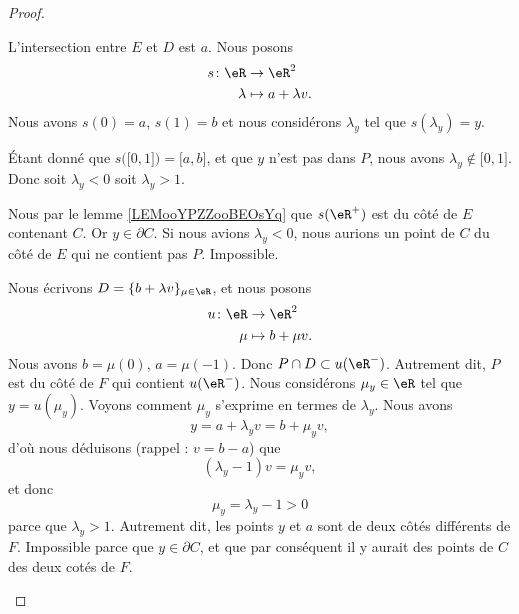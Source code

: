 \begin{proof}
\begin{subproof}
\begin{subproof}
			L'intersection entre \( E\) et \( D\) est \( a\). Nous posons
			\begin{equation}
				\begin{aligned}
					s\colon \eR & \to \eR^2            \\
					\lambda     & \mapsto a+\lambda v.
				\end{aligned}
			\end{equation}
			Nous avons \( s(0)=a\), \( s(1)=b\) et nous considérons \( \lambda_y\) tel que \( s(\lambda_y)=y\).


			\begin{subproof}
				Étant donné que \( s\big( \mathopen[ 0,1\mathclose] \big)=\mathopen[ a,b\mathclose]\), et que \( y\) n'est pas dans \( P\), nous avons \( \lambda_y\not\in\mathopen[ 0,1\mathclose]\). Donc soit \( \lambda_y<0\) soit \( \lambda_y>1\).

				\spitem[Si \( \lambda_y<0\)]
				Nous par le lemme \ref{LEMooYPZZooBEOsYq} que \( s(\eR^+)\) est du côté de \( E\) contenant \( C\). Or \( y\in\partial C\). Si nous avions \( \lambda_y<0\), nous aurions un point de \( C\) du côté de \( E\) qui ne contient pas \( P\). Impossible.

				\spitem[Si \( \lambda_y>1\)]
				Nous écrivons \( D=\{ b+\lambda v \}_{\mu\in \eR}\), et nous posons
				\begin{equation}
					\begin{aligned}
						u\colon \eR & \to \eR^2        \\
						\mu         & \mapsto b+\mu v.
					\end{aligned}
				\end{equation}
				Nous avons \( b=\mu(0)\), \( a=\mu(-1)\). Donc \( P\cap D\subset u(\eR^-)\). Autrement dit, \( P\) est du côté de \( F\) qui contient \( u(\eR^-)\). Nous considérons \( \mu_y\in \eR\) tel que \( y=u(\mu_y)\). Voyons comment \( \mu_y\) s'exprime en termes de \( \lambda_y\). Nous avons
				\begin{equation}
					y=a+\lambda_y v=b+\mu_y v,
				\end{equation}
				d'où nous déduisons (rappel : \( v=b-a\)) que
				\begin{equation}
					(\lambda_y-1)v=\mu_y v,
				\end{equation}
				et donc
				\begin{equation}
					\mu_y=\lambda_y-1>0
				\end{equation}
				parce que \( \lambda_y>1\). Autrement dit, les points \( y\) et \( a\) sont de deux côtés différents de \( F\). Impossible parce que \( y\in \partial C\), et que par conséquent il y aurait des points de \( C\) des deux cotés de \( F\).
			\end{subproof}
		\end{subproof}
	\end{subproof}
\end{proof}


